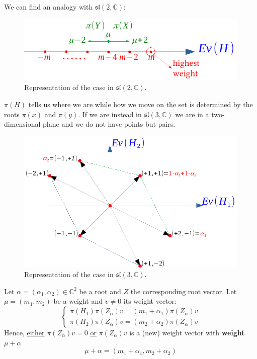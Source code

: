 \documentclass[../main.tex]{subfiles}
\begin{document}
We can find an analogy with $\mathfrak{sl}(2,\mathbb{C})$:
\begin{figure}[h!]
    \centering
    \includegraphics{images/highestweight.pdf}
    \caption{Representation of the case in $\mathfrak{sl}(2,\mathbb{C})$.}
\end{figure}
$\pi(H)$ tells us where we are while how we move on the set is determined by the roots $\pi(x)$ and $\pi(y)$. If we are instead in $\mathfrak{sl}(3,\mathbb{C})$ we are in a two-dimensional plane and we do not have points but pairs.
\begin{figure}[h!]
    \centering
    \includegraphics{images/case_sl(3,C).pdf}
    \caption{Representation of the case in $\mathfrak{sl}(3,\mathbb{C})$.}
\end{figure}
\begin{lemma}
Let $\alpha=(\alpha_1,\alpha_2)\in\mathbb{C}^2$ be a root and $Z$ the corresponding root vector. Let $\mu=(m_1,m_2)$ be a weight and $v\neq0$ its weight vector:
\[
\begin{cases}
\pi(H_1)\pi(Z_\alpha)v=(m_1+\alpha_1)\pi(Z_\alpha)v\\
\pi(H_2)\pi(Z_\alpha)v=(m_2+\alpha_2)\pi(Z_\alpha)v
\end{cases}
\]
Hence, \underline{either} $\pi(Z_\alpha)v=0$ \underline{or} $\pi(Z_\alpha)v$ is a (new) weight vector with \textbf{weight} {\color{red}$\mu+\alpha$}
\[
\mu+\alpha=(m_1+\alpha_1,m_2+\alpha_2)
\]
\end{lemma}
\end{document}
